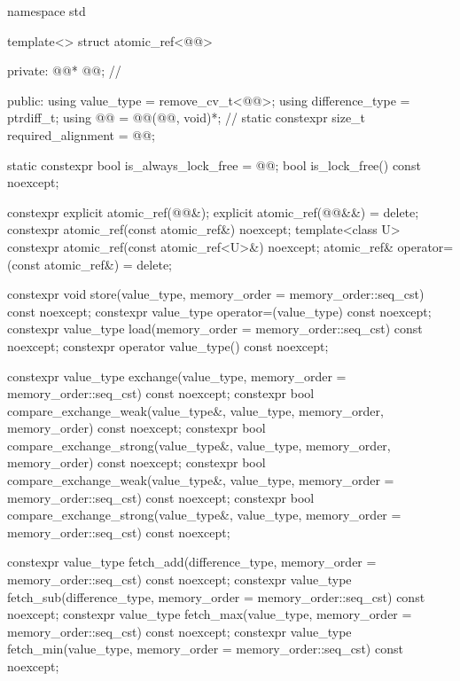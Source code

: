 \begin{codeblock}
namespace std {
  template<> struct atomic_ref<@@> {
  private:
    @@* @@;        // \expos

  public:
    using value_type = remove_cv_t<@@>;
    using difference_type = ptrdiff_t;
    using @@ = @@(@@, void)*;       // \expos
    static constexpr size_t required_alignment = @@;

    static constexpr bool is_always_lock_free = @@;
    bool is_lock_free() const noexcept;

    constexpr explicit atomic_ref(@@&);
    explicit atomic_ref(@@&&) = delete;
    constexpr atomic_ref(const atomic_ref&) noexcept;
    template<class U>
      constexpr atomic_ref(const atomic_ref<U>&) noexcept;
    atomic_ref& operator=(const atomic_ref&) = delete;

    constexpr void store(value_type, memory_order = memory_order::seq_cst) const noexcept;
    constexpr value_type operator=(value_type) const noexcept;
    constexpr value_type load(memory_order = memory_order::seq_cst) const noexcept;
    constexpr operator value_type() const noexcept;

    constexpr value_type exchange(value_type,
                                  memory_order = memory_order::seq_cst) const noexcept;
    constexpr bool compare_exchange_weak(value_type&, value_type,
                                         memory_order, memory_order) const noexcept;
    constexpr bool compare_exchange_strong(value_type&, value_type,
                                           memory_order, memory_order) const noexcept;
    constexpr bool compare_exchange_weak(value_type&, value_type,
                                         memory_order = memory_order::seq_cst) const noexcept;
    constexpr bool compare_exchange_strong(value_type&, value_type,
                                           memory_order = memory_order::seq_cst) const noexcept;

    constexpr value_type fetch_add(difference_type,
                                   memory_order = memory_order::seq_cst) const noexcept;
    constexpr value_type fetch_sub(difference_type,
                                   memory_order = memory_order::seq_cst) const noexcept;
    constexpr value_type fetch_max(value_type,
                                   memory_order = memory_order::seq_cst) const noexcept;
    constexpr value_type fetch_min(value_type,
                                   memory_order = memory_order::seq_cst) const noexcept;

}}
\end{codeblock}
